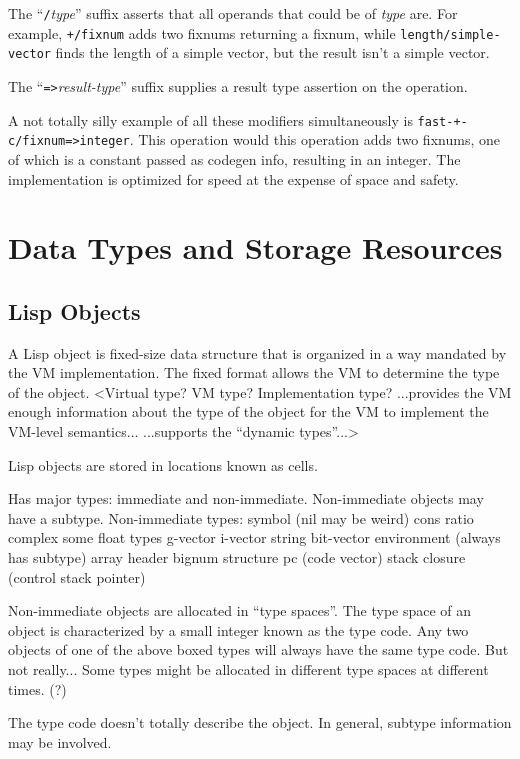 The ``{\tt /}{\it type}'' suffix asserts that all operands that could be of {\it type} are.
For example, {\tt +/fixnum} adds two fixnums returning a fixnum, while
{\tt length/simple-vector} finds the length of a simple vector, but the result isn't
a simple vector.

The ``{\tt =>}{\it result-type}'' suffix supplies a result type assertion on the
operation.

A not totally silly example of all these modifiers simultaneously is
 {\tt fast-+-c/fixnum=>integer}.  This operation would this operation adds two
fixnums, one of which is a constant passed as codegen info, resulting in an
integer.  The implementation is optimized for speed at the expense of space and
safety.


\chapter{Data Types and Storage Resources}

\section{Lisp Objects}

A Lisp object is fixed-size data structure that is organized in a way mandated
by the VM implementation.  The fixed format allows the VM to determine the type
of the object.  \comment<Virtual type?  VM type?  Implementation type?
...provides the VM enough information about the type of the object for the VM
to implement the VM-level semantics...  ...supports the ``dynamic types''...>

Lisp objects are stored in locations known as cells. 


Has major types: immediate and non-immediate.
Non-immediate objects may have a subtype.
Non-immediate types:
  symbol (nil may be weird)
  cons 
  ratio
  complex
  some float types
  g-vector
  i-vector
  string
  bit-vector
  environment (always has subtype)
  array header
  bignum
  structure
  pc (code vector)
  stack closure (control stack pointer)

Non-immediate objects are allocated in ``type spaces''.  The type space of an
object is characterized by a small integer known as the type code.  Any two
objects of one of the above boxed types will always have the same type code.
{But not really...  Some types might be allocated in different type spaces at
different times. (?)}

The type code doesn't totally describe the object.  In general, subtype
information may be involved.


